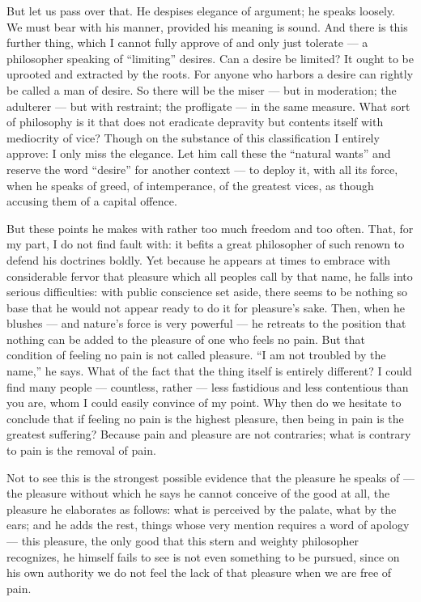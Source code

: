 But let us pass over that. He despises elegance of argument; he speaks loosely. We must bear with his manner, provided his meaning is sound. And there is this further thing, which I cannot fully approve of and only just tolerate — a philosopher speaking of ``limiting'' desires. Can a desire be limited? It ought to be uprooted and extracted by the roots. For anyone who harbors a desire can rightly be called a man of desire. So there will be the miser — but in moderation; the adulterer — but with restraint; the profligate — in the same measure. What sort of philosophy is it that does not eradicate depravity but contents itself with mediocrity of vice? Though on the substance of this classification I entirely approve: I only miss the elegance. Let him call these the ``natural wants'' and reserve the word ``desire'' for another context — to deploy it, with all its force, when he speaks of greed, of intemperance, of the greatest vices, as though accusing them of a capital offence.

But these points he makes with rather too much freedom and too often. That, for my part, I do not find fault with: it befits a great philosopher of such renown to defend his doctrines boldly. Yet because he appears at times to embrace with considerable fervor that pleasure which all peoples call by that name, he falls into serious difficulties: with public conscience set aside, there seems to be nothing so base that he would not appear ready to do it for pleasure's sake. Then, when he blushes — and nature's force is very powerful — he retreats to the position that nothing can be added to the pleasure of one who feels no pain. But that condition of feeling no pain is not called pleasure. ``I am not troubled by the name,'' he says. What of the fact that the thing itself is entirely different? I could find many people — countless, rather — less fastidious and less contentious than you are, whom I could easily convince of my point. Why then do we hesitate to conclude that if feeling no pain is the highest pleasure, then being in pain is the greatest suffering? Because pain and pleasure are not contraries; what is contrary to pain is the removal of pain.

Not to see this is the strongest possible evidence that the pleasure he speaks of — the pleasure without which he says he cannot conceive of the good at all, the pleasure he elaborates as follows: what is perceived by the palate, what by the ears; and he adds the rest, things whose very mention requires a word of apology — this pleasure, the only good that this stern and weighty philosopher recognizes, he himself fails to see is not even something to be pursued, since on his own authority we do not feel the lack of that pleasure when we are free of pain.

